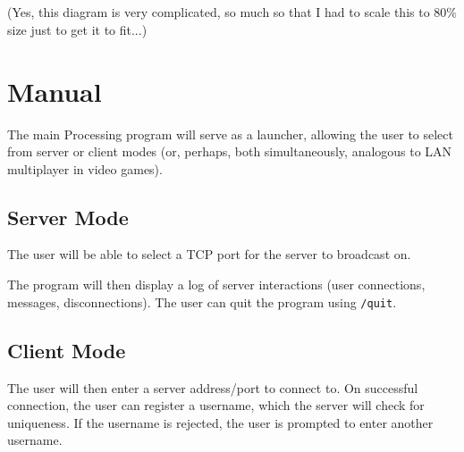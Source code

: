 \documentclass{article}
\begin{document}
\begin{landscape}
\\\\
(Yes, this diagram is very complicated, so much so that I had to scale this to 80\% size just to get it to fit...)
\end{landscape}

\section{Manual}
The main Processing program will serve as a launcher, allowing the user to select from server or client modes (or, perhaps, both simultaneously, analogous to LAN multiplayer in video games).

\subsection{Server Mode}
The user will be able to select a TCP port for the server to broadcast on.

The program will then display a log of server interactions (user connections, messages, disconnections). The user can quit the program using \verb|/quit|.

\subsection{Client Mode}
The user will then enter a server address/port to connect to. On successful connection, the user can register a username, which the server will check for uniqueness. If the username is rejected, the user is prompted to enter another username.
\end{document}
